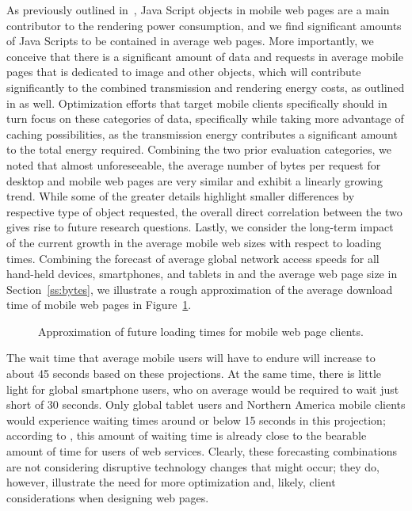 \documentclass[onecolumn,12pt]{IEEEtran}
\begin{document}
%
%
As previously outlined in~\cite{ThAgNiBoSi12}, Java Script objects in mobile web pages are a main contributor to the rendering power consumption, and we find significant amounts of Java Scripts to be contained in average web pages.
More importantly, we conceive that there is a significant amount of data and requests in average mobile pages that is dedicated to image and other objects, which will contribute significantly to the combined transmission and rendering energy costs, as outlined in \cite{ThAgNiBoSi12} as well.
Optimization efforts that target mobile clients specifically should in turn focus on these categories of data, specifically while taking more advantage of caching possibilities, as the transmission energy contributes a significant amount to the total energy required.
%
%
Combining the two prior evaluation categories, we noted that almost unforeseeable, the average number of bytes per request for desktop and mobile web pages are very similar and exhibit a linearly growing trend.
While some of the greater details highlight smaller differences by respective type of object requested, the overall direct correlation between the two gives rise to future research questions.
%
%
Lastly, we consider the long-term impact of the current growth in the average mobile web sizes with respect to loading times. 
Combining the forecast of average global network access speeds for all hand-held devices, smartphones, and tablets in \cite{Ci13} and the average web page size in Section~\ref{ss:bytes}, we illustrate a rough approximation of the average download time of mobile web pages in Figure~\ref{fig:loading}.
\begin{figure}
	\centering
	\caption{Approximation of future loading times for mobile web page clients.\label{fig:loading}}
\end{figure}
The wait time that average mobile users will have to endure will increase to about 45 seconds based on these projections. 
At the same time, there is little light for global smartphone users, who on average would be required to wait just short of 30 seconds.
Only global tablet users and Northern America mobile clients would experience waiting times around or below 15 seconds in this projection; according to \cite{NiUeNa10}, this amount of waiting time is already close to the bearable amount of time for users of web services.
Clearly, these forecasting combinations are not considering disruptive technology changes that might occur; they do, however, illustrate the need for more optimization and, likely, client considerations when designing web pages.
\end{document}
